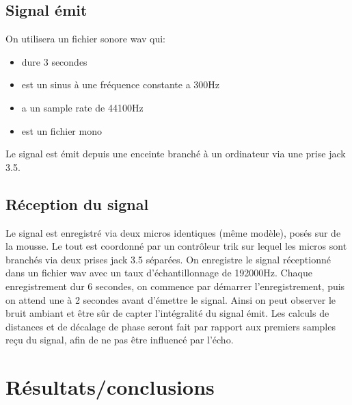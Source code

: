 \documentclass[12pt,a4paper]{report}
\begin{document}
\subsection{Signal émit}
On utilisera un fichier sonore wav qui:
\begin{itemize}
\item dure 3 secondes
\item est un sinus à une fréquence constante a 300Hz
\item a un sample rate de 44100Hz
\item est un fichier mono
\end{itemize}
Le signal est émit depuis une enceinte branché à un ordinateur via une prise jack 3.5.



\subsection{Réception du signal}
Le signal est enregistré via deux micros identiques (même modèle), posés sur de la mousse. Le tout est coordonné par un contrôleur trik sur lequel les micros sont branchés via deux prises jack 3.5 séparées.
On enregistre le signal réceptionné dans un fichier wav avec un taux d'échantillonnage de 192000Hz.
Chaque enregistrement dur 6 secondes, on commence par démarrer l'enregistrement, puis on attend une à 2 secondes avant d'émettre le signal. Ainsi on peut observer le bruit ambiant et être sûr de capter l'intégralité du signal émit.
Les calculs de distances et de décalage de phase seront fait par rapport aux premiers samples reçu du signal, afin de ne pas être influencé par l'écho.

\section{Résultats/conclusions}
\end{document}
